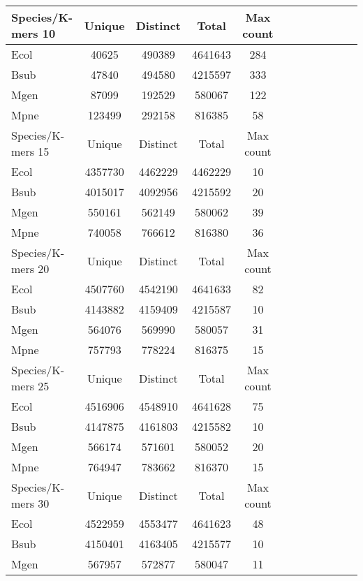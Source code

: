 %

\begin{table}[!h]
\centering
\newline
\begin{tabular}{lccccc c ccccc}
\hline
Species/K-mers 10      & Unique  & Distinct & Total & Max count  \\ \hline\hline
Ecol       & 40625 & 490389  & 4641643  & 284    \\
Bsub & 47840 & 494580  & 4215597  & 333   \\
Mgen & 87099 & 192529  & 580067  & 122  \\
Mpne    & 123499 & 292158  & 816385  & 58    \\ \hline\hline
Species/K-mers 15      & Unique  & Distinct & Total & Max count  \\ \hline\hline
Ecol       & 4357730 & 4462229  & 4462229  & 10    \\
Bsub & 4015017 & 4092956  & 4215592  & 20    \\
Mgen & 550161 & 562149  & 580062  & 39  \\
Mpne   & 740058 & 766612  & 816380  & 36    \\ \hline\hline
Species/K-mers 20      & Unique  & Distinct & Total & Max count \\ \hline\hline
Ecol       & 4507760 & 4542190  & 4641633  & 82  \\
Bsub & 4143882 & 4159409  & 4215587  & 10  \\
Mgen & 564076 & 569990  & 580057  & 31  \\
Mpne   & 757793 & 778224  & 816375  & 15  \\ \hline\hline
Species/K-mers 25      & Unique  & Distinct & Total & Max count \\ \hline\hline
Ecol &    4516906 &  4548910 &     4641628 & 75 \\
Bsub &    4147875 &  4161803 &     4215582 & 10 \\
Mgen &    566174 &  571601 &     580052 & 20 \\
Mpne &    764947 &  783662 &     816370 & 15 \\ \hline\hline
Species/K-mers 30      & Unique  & Distinct & Total & Max count \\ \hline\hline
Ecol &    4522959 &  4553477 &     4641623 & 48 \\
Bsub &    4150401 &  4163405 &     4215577 & 10 \\
Mgen &    567957 &  572877 &     580047 & 11 \\

\end{tabular}
\end{table}
